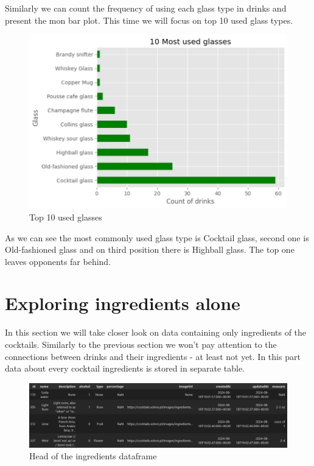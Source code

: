 \documentclass[a4paper]{article}
\begin{document}
Similarly we can count the frequency of using each glass type in drinks and present the mon bar plot. This time we will focus on top 10 used glass types.

\begin{figure}[H]
    \centering
    \includegraphics[width=0.9\linewidth]{glass types.png}
    \caption{Top 10 used glasses}
    \label{fig:enter-label}
\end{figure}

As we can see the most commonly used glass type is Cocktail glass, second one is Old-fashioned glass and on third position there is Highball glass. The top one leaves opponents far behind.

\section{Exploring ingredients alone}
In this section we will take closer look on data containing only ingredients of the cocktails. Similarly to the previous section we won't pay attention to the connections between drinks and their ingredients - at least not yet. In this part data about every cocktail ingredients is stored in separate table.

\begin{figure}[H]
    \centering
    \includegraphics[width=1\linewidth]{ingrhead.png}
    \caption{Head of the ingredients dataframe}
    \label{fig:enter-label}
\end{figure}
\end{document}
